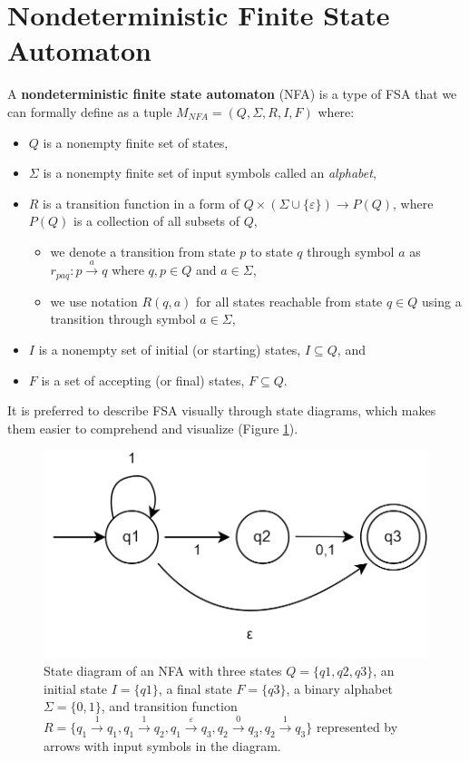 \section{Nondeterministic Finite State Automaton}
\label{sec:NFA}

A \textbf{nondeterministic finite state automaton} (NFA) is a type of FSA that we can formally define as a tuple $M_{NFA}=(Q, \Sigma, R, I, F)$ where:

\begin{itemize}
    \item $Q$ is a nonempty finite set of states,
    \item $\Sigma$ is a nonempty finite set of input symbols called an \textit{alphabet},
    \item $R$ is a transition function in a form of $Q\times (\Sigma \cup \{\varepsilon \})  \to P(Q)$, where $P(Q)$ is a collection of all subsets of $Q$,
    
    \begin{itemize}
        \item we denote a transition from state $p$ to state $q$ through symbol $a$ as $r_{paq}\colon p\xrightarrow{a}q$ where $q,p \in Q$ and $a \in \Sigma$, 
        \item we use notation $R(q,a)$ for all states reachable from state $q \in Q$ using a transition through symbol $a \in \Sigma$,
    \end{itemize}
    
    \item $I$ is a nonempty set of initial (or starting) states, $I \subseteq Q$, and
    \item $F$ is a set of accepting (or final) states, $F \subseteq Q$.
\end{itemize}

It is preferred to describe FSA visually through state diagrams, which makes them easier to comprehend and visualize (Figure \ref{NFA}). \\

\begin{figure}[ht]
    \label{NFA}
    \centering
    \includegraphics[width=0.5\linewidth]{obrazky-figures/NFA.drawio.png}
    \caption{State diagram of an NFA with three states $Q=\{q1, q2, q3\}$, an initial state $I=\{q1\}$, a final state $F=\{q3\}$, a binary alphabet $\Sigma = \{0, 1\}$, and transition function $R=\{q_1 \xrightarrow{1} q_1,q_1 \xrightarrow{1} q_2,q_1 \xrightarrow{\varepsilon} q_3, q_2 \xrightarrow{0} q_3, q_2 \xrightarrow{1} q_3\}$ represented by arrows with input symbols in the diagram.}
\end{figure}

